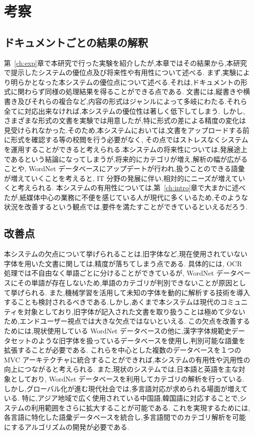 \chapter{考察}
\label{ch:eval}

\quad

\section{ドキュメントごとの結果の解釈}
\label{sec:eval_docs}

第~\ref{ch:exp}章で本研究で行った実験を紹介したが,本章ではその結果から,本研究で提示したシステムの優位点及び将来性や有用性について述べる.
まず,実験により明らかとなった本システムの優位点について述べる.それは,ドキュメントの形式に関わらず同様の処理結果を得ることができる点である.
文書には,縦書きや横書き及びそれらの複合など,内容の形式はジャンルによって多岐にわたる.それら全てに対応出来なければ,本システムの優位性は著しく低下してしまう.
しかし,さまざまな形式の文書を実験では用意したが,特に形式の差による精度の変化は見受けられなかった.そのため,本システムにおいては,文書をアップロードする前に形式を確認する等の校閲を行う必要がなく,
その点ではストレスなくシステムを運用することができると考えられる.本システムの将来性については,発展途上であるという結論になってしまうが,将来的にカテゴリが増え,解析の幅が広がることや,
WordNet データベースにアップデートが行われ,扱うことのできる語彙が増えていくことを考えると, IT 分野の発展に伴い,相対的にニーズが増えていくと考えられる.
本システムの有用性については,第~\ref{ch:intro}章で大まかに述べたが,紙媒体中心の業務に不便を感じている人が現代に多くいるため,そのような状況を改善するという観点では,要件を満たすことができているといえるだろう.

\section{改善点}
\label{sec:eval_improve}
本システムの欠点について挙げられることは,旧字体など,現在使用されていない字体を用いた文書に関しては,精度が落ちてしまう点である.
具体的には, OCR 処理では不自由なく単語ごとに分けることができているが, WordNet データベースにその単語が存在しないため,単語のカテゴリが判別できないことが原因として挙げられる.
また,機械学習を活用して未知の字体を動的に解析する技術を導入することも検討されるべきである.しかし,あくまで本システムは現代のコミュニティを対象としており,旧字体が記入された文書を取り扱うことは極めて少ないため,エンドユーザー視点では大きな欠点ではないといえる.
この欠点を改善するためには,現状使用している WordNet データべースの他に,漢字字体規範史データセットのような旧字体を扱っているデータベースを使用し,判別可能な語彙を拡張することが必要である.
これらを中心とした複数のデータベースを１つの MVC アーキテクチャに統合することができれば,本システムの有用性や汎用性の向上につながると考えられる.
また,現状のシステムでは,日本語と英語を主な対象としており, WordNet データベースを利用してカテゴリの解析を行っている.しかし,グローバル化が進む現代社会では,多言語対応が求められる場面が増えている.
特に,アジア地域で広く使用されている中国語,韓国語に対応することで,システムの利用範囲をさらに拡大することが可能である.
これを実現するためには,各言語に特化した語彙データベースを統合し,多言語間でのカテゴリ解析を可能にするアルゴリズムの開発が必要である.
